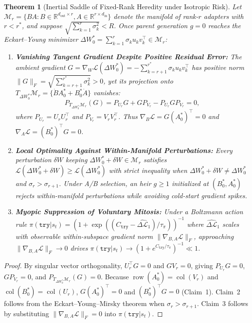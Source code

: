 \documentclass[10pt,a4paper]{article}
\newtheorem{theorem}{Theorem}[section]
\begin{document}
\begin{theorem}[Inertial Saddle of Fixed-Rank Heredity under Isotropic Risk]\label{thm:inertia}
Let $\mathcal{M}_r = \{B A : B \in \mathbb{R}^{d_{\text{out}} \times r}, A \in \mathbb{R}^{r \times d_{\text{in}}}\}$ denote the manifold of rank-$r$ adapters with $r < r^*$, and suppose $\sqrt{\sum_{k=1}^r \sigma_k^2} < R$. Once parent generation $g=0$ reaches the Eckart--Young minimizer $\Delta W_0^* = \sum_{k=1}^r \sigma_k u_k v_k^\top \in \mathcal{M}_r$:
\begin{enumerate}
  \item \textbf{Vanishing Tangent Gradient Despite Positive Residual Error:} The ambient gradient $G = \nabla_W \mathcal{L}(\Delta W_0^*) = -\sum_{k=r+1}^{r^*} \sigma_k u_k v_k^\top$ has positive norm $\|G\|_F = \sqrt{\sum_{k=r+1}^{r^*} \sigma_k^2} > 0$, yet its projection onto $T_{\Delta W_0^*}\mathcal{M}_r = \{ \dot{B} A_0^* + B_0^* \dot{A} \}$ vanishes:
  \begin{equation}
    P_{T_{\Delta W_0^*}\mathcal{M}_r}(G) = P_{U_r} G + G P_{V_r} - P_{U_r} G P_{V_r} = 0,
  \end{equation}
  where $P_{U_r} = U_r U_r^\top$ and $P_{V_r} = V_r V_r^\top$. Thus $\nabla_B \mathcal{L} = G (A_0^*)^\top = 0$ and $\nabla_A \mathcal{L} = (B_0^*)^\top G = 0$.
  \item \textbf{Local Optimality Against Within-Manifold Perturbations:} Every perturbation $\delta W$ keeping $\Delta W_0^* + \delta W \in \mathcal{M}_r$ satisfies $\mathcal{L}(\Delta W_0^* + \delta W) \ge \mathcal{L}(\Delta W_0^*)$ with strict inequality when $\Delta W_0^* + \delta W \neq \Delta W_0^*$ and $\sigma_r > \sigma_{r+1}$. Under A/B selection, an heir $g \ge 1$ initialized at $(B_0^*, A_0^*)$ rejects within-manifold perturbations while avoiding cold-start gradient spikes.
  \item \textbf{Myopic Suppression of Voluntary Mitosis:} Under a Boltzmann action rule $\pi(\texttt{try}|s_t) = (1 + \exp((C_{\texttt{try}} - \widehat{\Delta \mathcal{L}}_1)/\tau_{\pi}))^{-1}$ where $\widehat{\Delta \mathcal{L}}_1$ scales with observable within-subspace gradient norm $\|\nabla_{B,A}\mathcal{L}\|_F$, approaching $\|\nabla_{B,A}\mathcal{L}\|_F \to 0$ drives $\pi(\texttt{try}|s_t) \to (1 + e^{C_{\texttt{try}}/\tau_\pi})^{-1} \ll 1$.
\end{enumerate}
\end{theorem}

\begin{proof}
By singular vector orthogonality, $U_r^\top G = 0$ and $G V_r = 0$, giving $P_{U_r} G = 0$, $G P_{V_r} = 0$, and $P_{T_{\Delta W_0^*}\mathcal{M}_r}(G) = 0$. Because $\operatorname{row}(A_0^*) = \operatorname{col}(V_r)$ and $\operatorname{col}(B_0^*) = \operatorname{col}(U_r)$, $G(A_0^*)^\top = 0$ and $(B_0^*)^\top G = 0$ (Claim~1). Claim~2 follows from the Eckart--Young--Mirsky theorem when $\sigma_r > \sigma_{r+1}$. Claim~3 follows by substituting $\|\nabla_{B,A}\mathcal{L}\|_F = 0$ into $\pi(\texttt{try}|s_t)$.
\end{proof}
\end{document}
